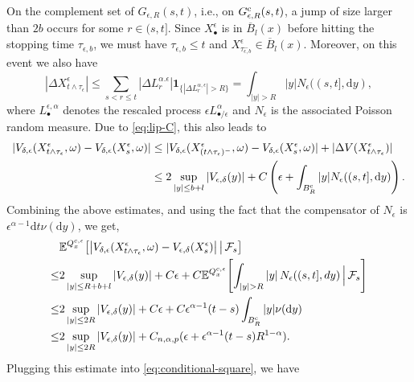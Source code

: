 \documentclass[11pt,reqno]{amsart}
\theoremstyle{definition}
\theoremstyle{remark}
\numberwithin{equation}{section}
\newcommand{\eps}{\epsilon}
\newcommand{\dd}{\mathrm{d}}
\begin{document}
On the complement set of $G_{\eps,R}(s,t)$, i.e., on $G^{\rm c}_{\eps,R}(s,t)$, a jump of size larger than $2b$ occurs for some $r\in (s,t]$. Since  $X^\eps_\bullet$ is in $\overline{B}_l(x)$ before hitting the stopping time $\tau_{\eps,b}$, we must have $\tau_{\eps,b}\le t$ and $X^\eps_{\tau_{\eps,b}^-} \in \overline{B}_l(x)$. Moreover, on this event we also have
\begin{equation*}
    |\Delta X_{t\wedge\tau_\epsilon}^\epsilon| 
 \leq  \sum_{s<r\leq t} |\Delta L_r^{\alpha.\eps}|\mathbf1_{\{| \Delta L_r^{\alpha,\eps}|>R\}} = \int_{|y|>R} |y| N_\eps((s,t],\dd y),
\end{equation*}
where $L^{\eps,\alpha}_\bullet$ denotes the rescaled process $\eps L^\alpha_{\bullet/\eps}$ and $N_\eps$ is the associated Poisson random measure. Due to \eqref{eq:lip-C}, this also leads to
\begin{equation}
    \label{E:jumppath}
    \begin{aligned}
    |V_{\delta,\epsilon}(X_{t\wedge\tau_\epsilon}^\epsilon,\omega)-V_{\delta,\epsilon}(X_s^\epsilon,\omega)| &\le |V_{\delta,\epsilon}(X_{(t\wedge\tau_\epsilon)^-}^\epsilon,\omega)-V_{\delta,\epsilon}(X_s^\epsilon,\omega)| + |\Delta V(X^\eps_{t\wedge \tau_\eps})|\\
    &\le 2\sup_{|y| \le b+l} |V_{\eps,\delta}(y)| + C\left(\eps + \int_{B_R^{\rm c}} |y| N_\eps((s,t],\dd y)\right).
    \end{aligned}
\end{equation}
Combining the above estimates, and using the fact that the compensator of $N_\eps$ is $\eps^{\alpha-1}\dd t\nu(\dd y)$, we get,
\begin{equation}\label{eq:overshoot-tail}
\begin{aligned}
 &\mathbb E^{Q_x^{c,\epsilon}}\!\left[\left|V_{\delta,\epsilon}(X_{t\wedge\tau_\epsilon}^\epsilon,\omega) - V_{\eps,\delta}(X^\eps_s)\right|
 \,\middle|\,\mathcal F_s
 \right]\\
\leq & 2\sup_{|y|\le R+b+l}|V_{\eps,\delta}(y)| + C\eps + C\mathbb{E}^{Q_x^{c,\epsilon}}\!\left[\int_{|y|>R} |y|\,N_\eps((s,t],dy) \,\Big| \, \mathcal{F}_s\right]\\
\leq & 2\sup_{|y|\le 2R}|V_{\eps,\delta}(y)| + C\eps + C\eps^{\alpha-1}(t-s)\int_{B_R^{\rm c}} |y|\nu(\dd y)\\
\le & 2\sup_{|y|\le 2R}|V_{\eps,\delta}(y)| + C_{n,\alpha,p}(\eps + \eps^{\alpha-1}(t-s)R^{1-\alpha}).
\end{aligned}
\end{equation}
Plugging this estimate into \eqref{eq:conditional-square}, we have
\end{document}
